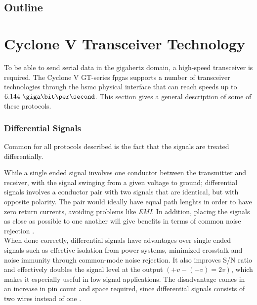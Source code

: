 \documentclass[main.tex]{subfiles}
\begin{document}
\section{Outline}


\chapter{Cyclone V Transceiver Technology}

To be able to send serial data in the gigahertz domain, a high-speed transceiver is required. The Cyclone V GT-series \glspl{fpga} supports a number of transceiver technologies through the \gls{hsmc} physical interface that can reach speeds up to $6.144\ \giga\bit\per\second$. This section gives a general description of some of these protocols.

\subsection{Differential Signals} \label{subsec:diffsig}

Common for all protocols described is the fact that the signals are treated differentially. 

While a single ended signal involves one conductor between the transmitter and receiver, with the signal swinging from a given voltage to ground; differential signals involves a conductor pair with two signals that are identical, but with opposite polarity. The pair would ideally have equal path lenghts in order to have zero return currents, avoiding problems like \textit{EMI}. In addition, placing the signals as close as possible to one another will give benefits in terms of common noise rejection \cite{douglas01}.\\

When done correctly, differential signals have advantages over single ended signals such as effective isolation from power systems, minimized crosstalk and noise immunity through common-mode noise rejection. It also improves S/N ratio and effectively doubles the signal level at the output $(+v - (-v) = 2v)$, which makes it especially useful in low signal applications. The disadvantage comes in an increase in pin count and space required, since differential signals consists of two wires instead of one \cite{douglas01}.
\end{document}
